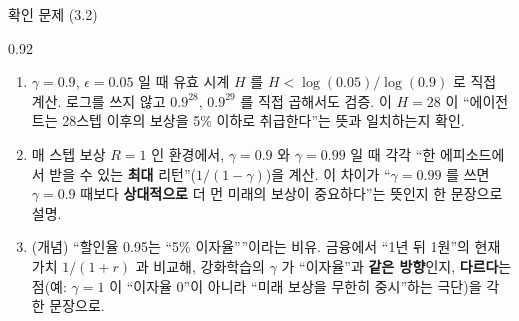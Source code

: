 \begin{frame}{확인 문제 (3.2)}
\begin{center}\begin{varwidth}{0.92\textwidth}
  \begin{enumerate}
    \item $\gamma = 0.9$, $\epsilon = 0.05$ 일 때 유효 시계 $H$ 를
      $H < \log(0.05)/\log(0.9)$ 로 직접 계산. 로그를 쓰지 않고
      $0.9^{28}$, $0.9^{29}$ 를 직접 곱해서도 검증. 이 $H = 28$ 이
      ``에이전트는 28스텝 이후의 보상을 5\% 이하로
      취급한다''는 뜻과 일치하는지 확인.
    \item 매 스텝 보상 $R = 1$ 인 환경에서, $\gamma = 0.9$ 와
      $\gamma = 0.99$ 일 때 각각 ``한 에피소드에서 받을 수
      있는 \textbf{최대} 리턴''($1/(1-\gamma)$)을 계산. 이 차이가
      ``$\gamma = 0.99$ 를 쓰면 $\gamma = 0.9$ 때보다
      \textbf{상대적으로} 더 먼 미래의 보상이 중요하다''는 뜻인지
      한 문장으로 설명.
    \item (개념) ``할인율 0.95는 ``5\% 이자율''''이라는 비유.
      금융에서 ``1년 뒤 1원''의 현재가치 $1/(1+r)$ 과 비교해,
      강화학습의 $\gamma$ 가 ``이자율''과 \textbf{같은 방향}인지,
      \textbf{다르다}는 점(예: $\gamma = 1$ 이 ``이자율 0''이
      아니라 ``미래 보상을 무한히 중시''하는 극단)을 각 한 문장으로.
  \end{enumerate}
\end{varwidth}\end{center}
\end{frame}

